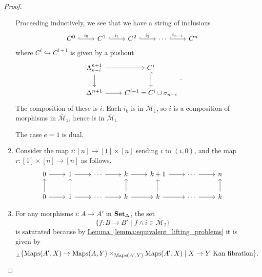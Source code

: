 \documentclass[main.tex]{subfiles}
\begin{document}
\begin{proof}
\begin{enumerate}
      Proceeding inductively, we see that we have a string of inclusions
      \begin{equation*}
        \begin{tikzcd}
          C^{0}
          \arrow[r, hook, "i_{0}"]
          & C^{1}
          \arrow[r, hook, "i_{1}"]
          & C^{2}
          \arrow[r, hook, "i_{2}"]
          & \cdots
          \arrow[r, hook, "i_{n-1}"]
          & C^{n}
        \end{tikzcd}
      \end{equation*}
      where $C^{i} \hookrightarrow C^{i+1}$ is given by a pushout
      \begin{equation*}
        \begin{tikzcd}
          \Lambda^{n+1}_{n-i}
          \arrow[r]
          \arrow[d]
          & C^{i}
          \arrow[d, hook]
          \\
          \Delta^{n+1}
          \arrow[r]
          & C^{i+1} = C^{i} \cup \sigma_{n-i}
        \end{tikzcd}.
      \end{equation*}
      The composition of these is $i$. Each $i_{k}$ is in $\overline{\mathcal{M}}_{1}$, so $i$ is a composition of morphisms in $\overline{\mathcal{M}}_{1}$, hence is in $\overline{\mathcal{M}}_{1}$

      The case $e = 1$ is dual.

    \item Consider the map $i\colon [n] \to [1] \times [n]$ sending $i$ to $(i, 0)$, and the map $r\colon [1] \times [n] \to [n]$ as follows.
      \begin{equation*}
        \begin{tikzcd}
          0
          \arrow[r]
          & 1
          \arrow[r]
          & \cdots
          \arrow[r]
          & k
          \arrow[r]
          & k + 1
          \arrow[r]
          & \cdots
          \arrow[r]
          & n
          \\
          0
          \arrow[r]
          \arrow[u]
          & 1
          \arrow[r]
          \arrow[u]
          & \cdots
          \arrow[r]
          & k
          \arrow[r]
          \arrow[u]
          & k
          \arrow[r]
          \arrow[u]
          & \cdots
          \arrow[r]
          & k
          \arrow[u]
        \end{tikzcd}
      \end{equation*}

    \item For any morphisms $i\colon A \to A'$ in $\operatorname{\mathbf{Set}_{\Delta}}$, the set
      \begin{equation*}
        \{f\colon B \to B' \mid f \wedge i \in \overline{\mathcal{M}}_{2}\}
      \end{equation*}
      is saturated because by \hyperref[lemma:equivalent_lifting_problems]{Lemma~\ref*{lemma:equivalent_lifting_problems}} it is given by
      \begin{equation*}
        {}_{\perp}\{\operatorname{Maps}(A', X) \to \operatorname{Maps}(A, Y) \times_{\operatorname{Maps}(A', Y)} \operatorname{Maps}(A', X) \mid X \to Y \text{ Kan fibration}\}.
      \end{equation*}



\end{enumerate}
\end{proof}
\end{document}
